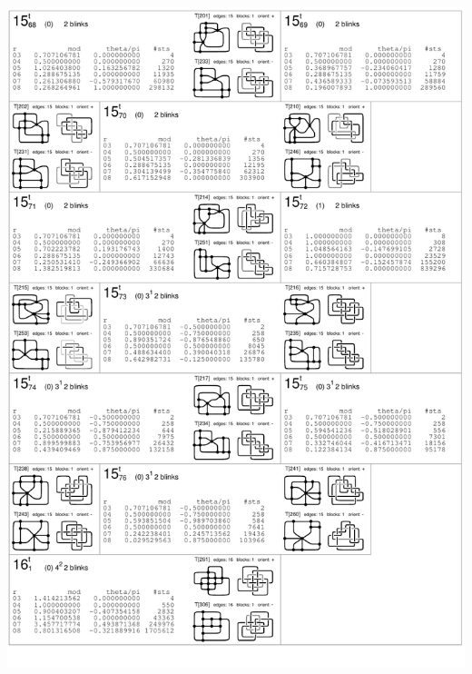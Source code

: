 \begin{center}
 \includegraphics[height=23.5cm]{E.figsbw2/con3catalog014_bw.pdf} \eject

\end{center}
